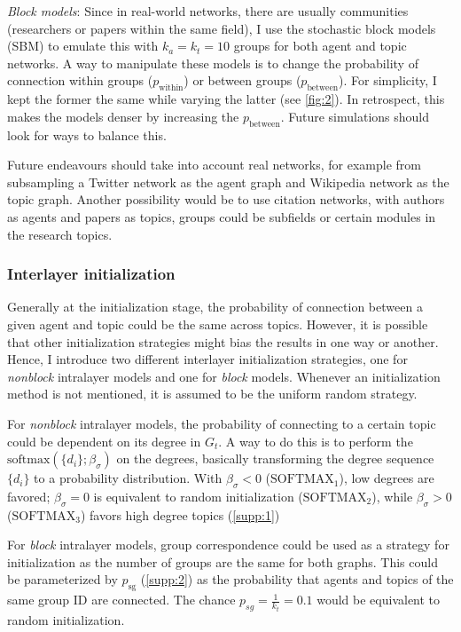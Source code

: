 \textit{Block models}: Since in real-world networks, there are usually communities (researchers or papers within the same field), I use the stochastic block models (SBM) to emulate this with $k_a = k_t = 10$ groups for both agent and topic networks. A way to manipulate these models is to change the probability of connection within groups ($p_{\mathrm{within}}$) or between groups ($p_{\mathrm{between}}$). For simplicity, I kept the former the same while varying the latter (see \ref{fig:2}). In retrospect, this makes the models denser by increasing the $p_{\mathrm{between}}$. Future simulations should look for ways to balance this.

Future endeavours should take into account real networks, for example from subsampling a Twitter network as the agent graph and Wikipedia network as the topic graph. Another possibility would be to use citation networks, with authors as agents and papers as topics, groups could be subfields or certain modules in the research topics.

\subsubsection*{Interlayer initialization}

Generally at the initialization stage, the probability of connection between a given agent and topic could be the same across topics. However, it is possible that other initialization strategies might bias the results in one way or another. Hence, I introduce two different interlayer initialization strategies, one for \textit{nonblock} intralayer models and one for \textit{block} models. Whenever an initialization method is not mentioned, it is assumed to be the uniform random strategy.

For \textit{nonblock} intralayer models, the probability of connecting to a certain topic could be dependent on its degree in $G_t$. A way to do this is to perform the $\mathrm{softmax}\left(\{d_i\}; \beta_{\sigma}\right)$ on the degrees, basically transforming the degree sequence $\{d_i\}$ to a probability distribution. With $\beta_{\sigma} < 0$ ($\mathrm{SOFTMAX}_1$), low degrees are favored; $\beta_{\sigma} = 0$ is equivalent to random initialization ($\mathrm{SOFTMAX}_2$), while $\beta_{\sigma} > 0$  ($\mathrm{SOFTMAX}_3$) favors high degree topics (\ref{supp:1})

For \textit{block} intralayer models, group correspondence could be used as a strategy for initialization as the number of groups are the same for both graphs. This could be parameterized by $p_{\mathrm{sg}}$ (\ref{supp:2}) as the probability that agents and topics of the same group ID are connected. The chance $p_{sg} = \frac{1}{k_t} = 0.1$ would be equivalent to random initialization.

